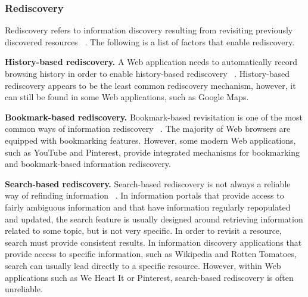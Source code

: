 {\subsubsection{Rediscovery}
Rediscovery refers to information discovery resulting from revisiting previously discovered resources ~\cite{tauscher}. The following is a list of factors that enable rediscovery.

\textbf{History-based rediscovery.} A Web application needs to automatically record browsing history in order to enable history-based rediscovery ~\cite{tauscher}. History-based rediscovery appears to be the least common rediscovery mechanism, however, it can still be found in some Web applications, such as Google Maps.

\textbf{Bookmark-based rediscovery.} Bookmark-based revisitation is one of the most common ways of information rediscovery ~\cite{abrams}. The majority of Web browsers are equipped with bookmarking features. However, some modern Web applications, such as YouTube and Pinterest, provide integrated mechanisms for bookmarking and bookmark-based information rediscovery. 

\textbf{Search-based rediscovery.} Search-based rediscovery is not always a reliable way of refinding information ~\cite{cockburn}. In information portals that provide access to fairly ambiguous information and that have information regularly repopulated and updated, the search feature is usually designed around retrieving information related to some topic, but is not very specific. In order to revisit a resource, search must provide consistent results. In information discovery applications that provide access to specific information, such as Wikipedia and Rotten Tomatoes, search can usually lead directly to a specific resource. However, within Web applications such as We Heart It or Pinterest, search-based rediscovery is often unreliable.

} %

